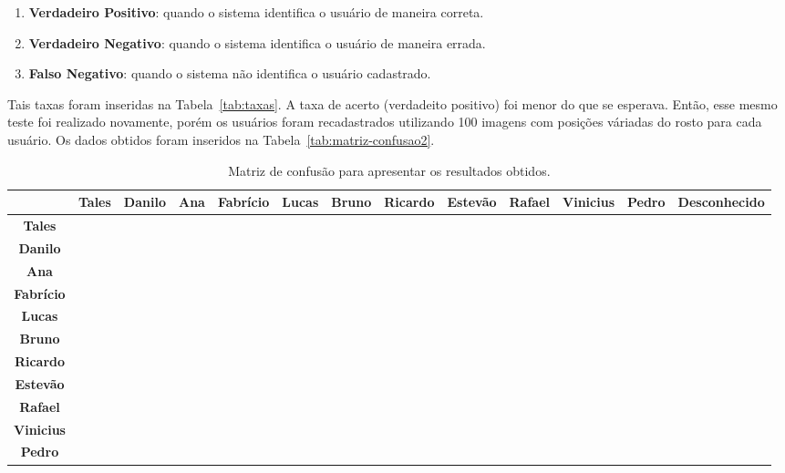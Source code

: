 	\begin{enumerate}
		\item \textbf{Verdadeiro Positivo}: quando o sistema identifica o usuário de maneira correta.
		\item \textbf{Verdadeiro Negativo}: quando o sistema identifica o usuário de maneira errada.
		\item \textbf{Falso Negativo}: quando o sistema não identifica o usuário cadastrado.
	\end{enumerate}

	Tais taxas foram inseridas na Tabela~\ref{tab:taxas}. A taxa de acerto (verdadeito positivo) foi menor do que se esperava. Então, esse mesmo teste foi realizado novamente, porém os usuários foram recadastrados utilizando 100 imagens com posições váriadas do rosto para cada usuário. Os dados obtidos foram inseridos na Tabela~\ref{tab:matriz-confusao2}.

	\begin{landscape}
	\begin{table}[htb]
		\begin{center}
			\caption{Matriz de confusão para apresentar os resultados obtidos.}
			\label{tab:matriz-confusao}
			\begin{tabular}{|c|c|c|c|c|c|c|c|c|c|c|c|c|}
				\hline  & \bf Tales & \bf Danilo & \bf Ana & \bf Fabrício & \bf Lucas & \bf Bruno & \bf Ricardo & \bf Estevão & \bf Rafael & \bf Vinicius & \bf Pedro & \bf Desconhecido\\
				\hline \bf Tales 		& 		 & 			& 		 & 			&   	 & 			& 		 & 			& 		 & 			& 		 & 	\\
				\hline \bf Danilo 	& 		 & 			& 		 & 			&   	 & 			& 		 & 			& 		 & 			& 		 &		 	\\
				\hline \bf Ana 			& 		 & 			& 		 & 			&   	 & 			& 		 & 			& 		 & 			& 		 &   \\
				\hline \bf Fabrício & 		 & 			& 		 &      &      & 			&      & 			&  	   & 		  & 		 &		  \\
				\hline \bf Lucas 		& 		 & 			& 		 & 			&      & 			& 		 & 			& 		 & 			&      &  \\
				\hline \bf Bruno 		& 		 & 			& 		 & 			& 		 &      & 		 & 			& 		 & 	  	& 		 & 	\\
				\hline \bf Ricardo 	& 		 & 			& 		 & 			& 		 & 			&      & 			& 		 & 			& 		 &   \\
				\hline \bf Estevão 	& 		 & 			& 		 & 			& 		 & 			& 		 &      & 		 & 			& 		 &  \\
				\hline \bf Rafael 	& 	 	 &	  	& 		 & 			&      & 			& 		 & 			&      & 		  & 		 &  \\
				\hline \bf Vinicius & 		 & 			& 		 & 			& 		 & 			& 		 & 			& 		 & 			& 		 &  \\
				\hline \bf Pedro 		& 		 & 			& 		 & 			& 		 & 			& 		 & 			& 		 & 			&      &		  \\
				\hline
			\end{tabular}
		\end{center}
	\end{table}
	\end{landscape}


